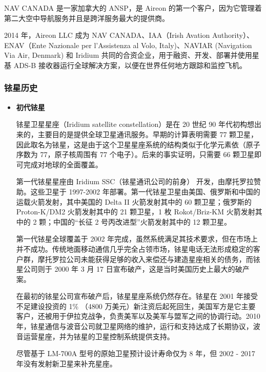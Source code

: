 NAV CANADA 是一家加拿大的 ANSP，是 Aireon 的第一个客户，因为它管理着第二大空中导航服务并且是跨洋服务最大的提供商。

2014 年，Aireon LLC 成为 NAV CANADA、IAA（Irish Avation Authority）、ENAV（Ente Nazionale per l'Assistenza al Volo, Italy)、NAVIAR (Navigation Via Air, Denmark) 和 Iridium 共同的合资企业，用于融资、开发、部署并使用星基 ADS-B 接收器运行全球解决方案，以便在世界任何地方跟踪和监控飞机。

\subsubsection{铱星历史}

\begin{itemize}
    \item \textbf{初代铱星}

    铱星卫星星座（Iridium satellite constellation）是在 20 世纪 90 年代初构想出来的，主要目的是提供全球卫星通讯服务。早期的计算表明需要 77 颗卫星，因此取名为铱星，这是由于这个卫星星座系统的结构类似于化学元素依（原子序数为 77，原子核周围有 77 个电子）。后来的事实证明，只需要 66 颗卫星即可完成对地球的全面覆盖。

    第一代铱星星座由 Iridium SSC（铱星通讯公司的前身） 开发，由摩托罗拉赞助。这些卫星于 1997-2002 年部署。第一代铱星卫星由美国、俄罗斯和中国的运载火箭发射，其中美国的 Delta II 火箭发射其中的 60 颗卫星；俄罗斯的 Proton-K/DM2 火箭发射其中的 21 颗卫星，1 枚 Rokot/Briz-KM 火箭发射其中的 2 颗；中国的“长征 2 号丙改进型”火箭发射其中的 12 颗卫星。

    第一代铱星全球覆盖于 2002 年完成，虽然系统满足其技术要求，但在市场上并不成功。传统地面移动通信几乎完全占领市场，铱星电话无法形成稳定的客户群，摩托罗拉公司未能获得足够的收入来偿还与建造星座相关的债务，而铱星公司则于 2000 年 3 月 17 日宣布破产，这是当时美国历史上最大的破产案。

    在最初的铱星公司宣布破产后，铱星星座系统仍然存在。铱星在 2001 年接受不足建设投资的 1\% （4800 万美元）新注资后起死回生，美国军方是它主要客户，还被用于伊拉克战争，负责美军以及美军与盟军之间的协调行动。2010 年，铱星通信与波音公司就卫星网络的维护，运行和支持达成了长期协议，波音运营星座，并为铱星的卫星控制系统提供支持。

    尽管基于 LM-700A 型号的原始卫星预计设计寿命仅为 8 年，但 2002 - 2017 年没有发射新卫星来补充星座。


\end{itemize}
